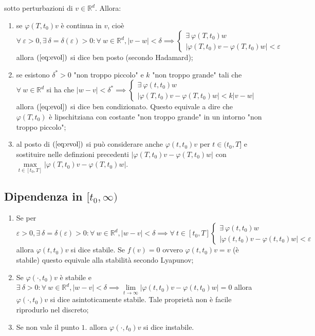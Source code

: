 \documentclass[hidelinks, 10pt]{report}
\begin{document}
sotto perturbazioni di $ v \in \mathbb{R}^{d} $. Allora: 	%
\begin{enumerate}
\item se $ \varphi(T, t_{0}) v $ \`e continua in $ v $, cio\`e $ \forall\ \varepsilon > 0, \exists\ \delta = \delta(\varepsilon) > 0 : \forall\ w \in \mathbb{R}^{d}, \vert v - w \vert < \delta \implies \begin{cases}
\exists\ \varphi (T, t_{0}) w \\
\vert \varphi (T, t_{0}) v - \varphi(T, t_{0}) w \vert < \varepsilon
\end{cases} $ allora $ (\ref{eq:evol}) $ si dice ben posto (secondo Hadamard);
\item se esistono $ \delta^{\ast} > 0 $ "non troppo piccolo" e $ k $ "non troppo grande" tali che $ \forall\ w \in \mathbb{R}^{d} $ si ha che $ \vert w - v \vert < \delta^{\ast} \implies \begin{cases}
\exists\ \varphi(t, t_{0}) w \\
\vert \varphi(T, t_{0}) v - \varphi(T, t_{0}) w \vert < k \vert v - w \vert
\end{cases} $ allora $ (\ref{eq:evol}) $ si dice ben condizionato. Questo equivale a dire che $ \varphi(T, t_{0}) $ \`e lipschitziana con costante "non troppo grande" in un intorno "non troppo piccolo";
\item al posto di $ (\ref{eq:evol}) $ si pu\`o considerare anche $ \varphi(t, t_{0}) v $ per $ t \in (t_{0}, T] $ e sostituire nelle definzioni precedenti $ \vert \varphi(T, t_{0}) v - \varphi(T, t_{0}) w \vert $ con $ \max\limits_{t \in [t_{0}, T]} \vert \varphi(T, t_{0}) v - \varphi(T, t_{0}) w \vert $.
\end{enumerate}

\subsection{Dipendenza in $ [t_{0}, \infty) $}
\begin{enumerate}
\item Se per $ \varepsilon > 0, \exists\ \delta = \delta (\varepsilon) > 0 : \forall\ w \in \mathbb{R}^{d}, \vert w - v \vert < \delta \implies \forall\ t \in [t_{0}, T] \begin{cases}
\exists\ \varphi(t, t_{0}) w \\
\vert \varphi (t, t_{0}) v - \varphi(t, t_{0}) w \vert < \varepsilon
\end{cases} $ allora $ \varphi(t, t_{0}) v $ si dice stabile. Se $ f(v) = 0 $ ovvero $ \varphi(t, t_{0}) v = v $ (\`e stabile) questo equivale alla stabilit\`a secondo Lyapunov;
\item Se $ \varphi(\cdot, t_{0}) v $ \`e stabile e $ \exists\ \delta > 0 : \forall\ w \in \mathbb{R}^{d}, \vert w - v \vert < \delta \implies \lim\limits_{t \to \infty} \vert \varphi(t, t_{0}) v - \varphi(t, t_{0}) w \vert = 0 $ allora $ \varphi(\cdot, t_{0}) v $ si dice asintoticamente stabile. Tale propriet\`a non \`e facile riprodurlo nel discreto;
\item Se non vale il punto $ 1. $ allora $ \varphi(\cdot, t_{0}) v $ si dice instabile. 
\end{enumerate}
\end{document}

